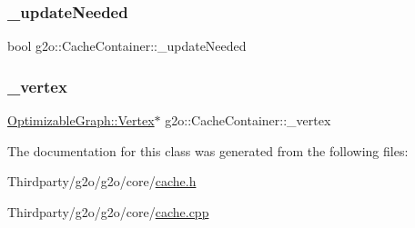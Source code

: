\subsubsection{\texorpdfstring{\+\_\+update\+Needed}{\_updateNeeded}}
{\footnotesize\ttfamily bool g2o\+::\+Cache\+Container\+::\+\_\+update\+Needed\hspace{0.3cm}{\ttfamily [protected]}}

\mbox{\label{classg2o_1_1_cache_container_a899b5f4d01859463cedf663b68f78391}} 
\subsubsection{\texorpdfstring{\+\_\+vertex}{\_vertex}}
{\footnotesize\ttfamily \mbox{\hyperlink{classg2o_1_1_optimizable_graph_1_1_vertex}{Optimizable\+Graph\+::\+Vertex}}$\ast$ g2o\+::\+Cache\+Container\+::\+\_\+vertex\hspace{0.3cm}{\ttfamily [protected]}}



The documentation for this class was generated from the following files\+:\begin{DoxyCompactItemize}
\item 
Thirdparty/g2o/g2o/core/\mbox{\hyperlink{cache_8h}{cache.\+h}}\item 
Thirdparty/g2o/g2o/core/\mbox{\hyperlink{cache_8cpp}{cache.\+cpp}}\end{DoxyCompactItemize}
